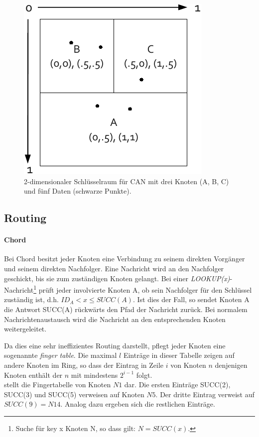 \begin{figure}[htbp]
\centering
\includegraphics{grafics/can_key_space.pdf}
\caption{2-dimensionaler Schlüsselraum für CAN mit drei Knoten (A, B, C) und fünf Daten (schwarze Punkte).}
\label{fig:can_key_space}
\end{figure}


\subsection{Routing}
\paragraph{Chord}
Bei Chord besitzt jeder Knoten eine Verbindung zu seinem direkten Vorgänger und seinem direkten Nachfolger. Eine Nachricht wird an den Nachfolger geschickt, bis sie zum zuständigen Knoten gelangt. Bei einer \emph{LOOKUP(x)}-Nachricht\footnote{Suche für key x Knoten N, so dass gilt: $N = SUCC(x)$.} prüft jeder involvierte Knoten A, ob sein Nachfolger für den Schlüssel zuständig ist, d.h. $ID_A < x \le SUCC(A)$. Ist dies der Fall, so sendet Knoten A die Antwort SUCC(A) rückwärts den Pfad der Nachricht zurück. Bei normalem Nachrichtenaustausch wird die Nachricht an den entsprechenden Knoten weitergeleitet.

Da dies eine sehr ineffizientes  Routing darstellt, pflegt jeder Knoten eine sogenannte \emph{finger table}. Die maximal $l$ Einträge in dieser Tabelle zeigen auf andere Knoten im Ring, so dass der Eintrag in Zeile $i$ von Knoten $n$ denjenigen Knoten enthält der $n$ mit mindestens $2^{i-1}$ folgt.\\
 stellt die Fingertabelle von Knoten $N1$ dar. Die ersten Einträge SUCC(2), SUCC(3) und SUCC(5) verweisen auf Knoten $N5$. Der dritte Eintrag verweist auf $SUCC(9) = N14$. Analog dazu ergeben sich die restlichen Einträge.

